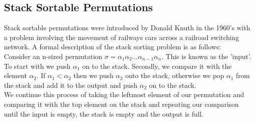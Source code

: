 \documentclass[12pt]{article}
\begin{document}
\subsection{Stack Sortable Permutations}
Stack sortable permutations were introduced by Donald Knuth in the 1960's with a problem involving the movement of railways cars across a railroad switching network. \cite{KnuthVol1} \cite{KnuthVol3}
\newline
A formal description of the stack sorting problem is as follows:\\
Consider an n-sized permutation $\sigma = \alpha_{1}\alpha_{2}...\alpha_{n-1}\alpha_{n}$. This is known as the 'input'. To start with we push $\alpha_{1}$ on to the stack. Secondly, we compare it with the element $\alpha_{2}$. If $\alpha_{1} < \alpha_{2}$ then we push $\alpha_{2}$ onto the stack, otherwise we pop $\alpha_{1}$ from the stack and add it to the output and push $\alpha_{2}$ on to the stack.\\
\newline
We continue this process of taking the leftmost element of our permutation and comparing it with the top element on the stack and repeating our comparison until the input is empty, the stack is empty and the output is full.
\end{document}
